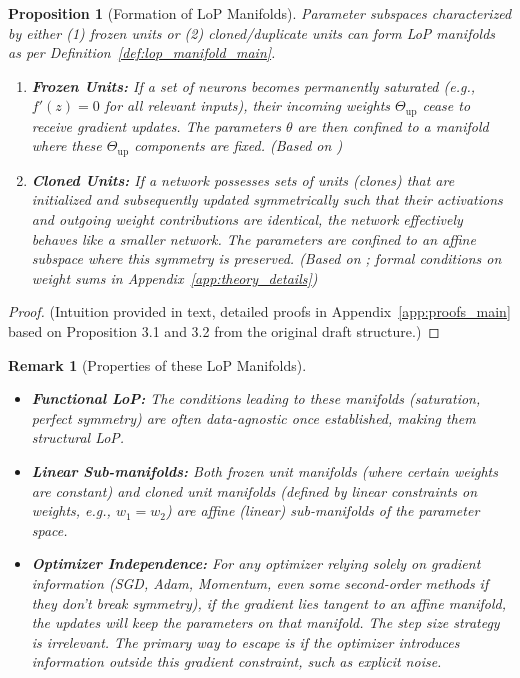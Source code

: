 \documentclass{article}
\newtheorem{proposition}{Proposition}[section]
\newtheorem{remark}{Remark}[section]
\begin{document}
\begin{proposition}[Formation of LoP Manifolds]
\label{prop:lop_manifold_formation}
Parameter subspaces characterized by either (1) frozen units or (2) cloned/duplicate units can form LoP manifolds as per Definition~\ref{def:lop_manifold_main}.
\begin{enumerate}
    \item \textbf{Frozen Units:} If a set of neurons becomes permanently saturated (e.g., $f'(z)=0$ for all relevant inputs), their incoming weights $\Theta_{\text{up}}$ cease to receive gradient updates. The parameters $\theta$ are then confined to a manifold where these $\Theta_{\text{up}}$ components are fixed. (Based on \citet{draft_placeholder_saturated_prop})
    \item \textbf{Cloned Units:} If a network possesses sets of units (clones) that are initialized and subsequently updated symmetrically such that their activations and outgoing weight contributions are identical, the network effectively behaves like a smaller network. The parameters are confined to an affine subspace where this symmetry is preserved. (Based on \citet{draft_placeholder_cloned_prop}; formal conditions on weight sums in Appendix~\ref{app:theory_details})
\end{enumerate}
\end{proposition}
\begin{proof}
(Intuition provided in text, detailed proofs in Appendix~\ref{app:proofs_main} based on Proposition 3.1 and 3.2 from the original draft structure.)
\end{proof}

\begin{remark}[Properties of these LoP Manifolds]
\label{rem:lop_manifold_properties}
\begin{itemize}
    \item \textbf{Functional LoP:} The conditions leading to these manifolds (saturation, perfect symmetry) are often data-agnostic once established, making them structural LoP.
    \item \textbf{Linear Sub-manifolds:} Both frozen unit manifolds (where certain weights are constant) and cloned unit manifolds (defined by linear constraints on weights, e.g., $w_1=w_2$) are affine (linear) sub-manifolds of the parameter space.
    \item \textbf{Optimizer Independence:} For any optimizer relying solely on gradient information (SGD, Adam, Momentum, even some second-order methods if they don't break symmetry), if the gradient lies tangent to an affine manifold, the updates will keep the parameters on that manifold. The step size strategy is irrelevant. The primary way to escape is if the optimizer introduces information outside this gradient constraint, such as explicit noise.
\end{itemize}
\end{remark}
\end{document}
